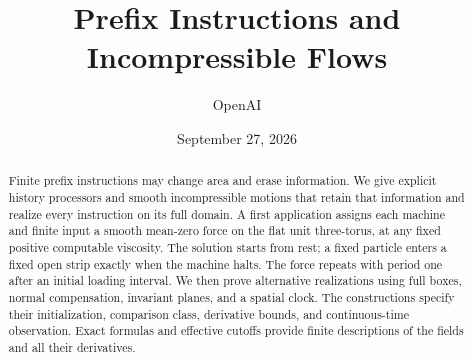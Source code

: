 \documentclass[11pt]{article}
\title{Prefix Instructions and Incompressible Flows}
\author{OpenAI}
\date{September 27, 2026}
\theoremstyle{remark}
\begin{document}
\maketitle
\begin{abstract}
Finite prefix instructions may change area and erase information. We give
explicit history processors and smooth incompressible motions that retain
that information and realize every instruction on its full domain. A first
application assigns each machine and finite input a smooth mean-zero force
on the flat unit three-torus, at any fixed positive computable viscosity.
The solution starts from rest; a fixed particle enters a fixed open strip
exactly when the machine halts. The force repeats with period one after an
initial loading interval. We then prove alternative realizations using
full boxes, normal compensation, invariant planes, and a spatial clock.
The constructions specify their initialization, comparison class, derivative
bounds, and continuous-time observation. Exact formulas and effective
cutoffs provide finite descriptions of the fields and all their derivatives.
\end{abstract}











\end{document}
